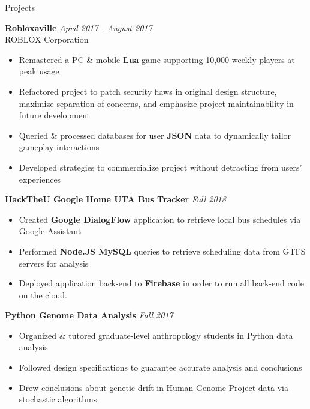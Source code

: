 \documentclass{resume} %
\begin{document}
\begin{rSection}{Projects}

{\bf Robloxaville} \hfill {\em April 2017 - August 2017}
\\ ROBLOX Corporation
\vspace{-6pt}
\begin{itemize}[nosep]
  \item Remastered a PC \& mobile {\bf Lua} game supporting 10,000 weekly players at peak usage
  \item Refactored project to patch security flaws in original design structure, maximize separation of concerns, and emphasize project maintainability in future development
  \item Queried \& processed databases for user {\bf JSON} data to dynamically tailor gameplay interactions
  \item Developed strategies to commercialize project without detracting from users' experiences
\end{itemize}

{\bf HackTheU Google Home UTA Bus Tracker} \hfill {\em Fall 2018}
\vspace{-6pt}
\begin{itemize}[nosep]
  \item Created {\bf Google DialogFlow} application to retrieve local bus schedules via Google Assistant
  \item Performed {\bf Node.JS MySQL} queries to retrieve scheduling data from GTFS servers for analysis
  \item Deployed application back-end to {\bf Firebase} in order to run all back-end code on the cloud.
\end{itemize}

{\bf Python Genome Data Analysis} \hfill {\em Fall 2017}
\vspace{-6pt}
\begin{itemize}[nosep]
  \item Organized \& tutored graduate-level anthropology students in Python data analysis
  \item Followed design specifications to guarantee accurate analysis and conclusions
  \item Drew conclusions about genetic drift in Human Genome Project data via stochastic algorithms
\end{itemize}

\end{rSection}
\end{document}
